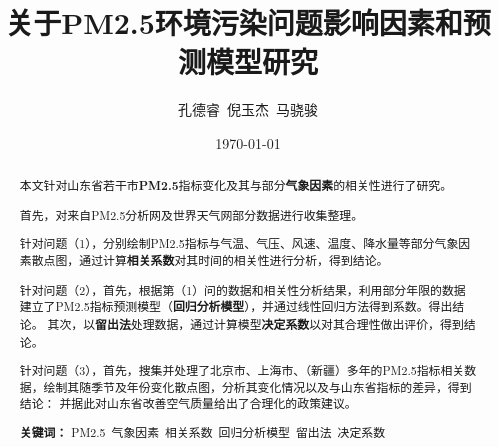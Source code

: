 \documentclass[12pt, a4paper, oneside]{ctexart}
\title{\textbf{\textbf{关于PM2.5环境污染问题影响因素和预测模型研究}}}
\author{孔德睿\ 倪玉杰\ 马骁骏}
\date{\today}
\begin{document}
    \thispagestyle{empty}
    \tableofcontents

    \newpage
    \setcounter{page}{0}
    \maketitle
    \thispagestyle{empty}

    \begin{abstract}
        本文针对山东省若干市\textbf{PM2.5}指标变化及其与部分\textbf{气象因素}的相关性进行了研究。
        \par 首先，对来自PM2.5分析网及世界天气网部分数据进行收集整理。
        \par 针对问题（1），分别绘制PM2.5指标与气温、气压、风速、温度、降水量等部分气象因素散点图，通过计算\textbf{相关系数}对其时间的相关性进行分析，得到结论。
        \par 针对问题（2），首先，根据第（1）问的数据和相关性分析结果，利用部分年限的数据建立了PM2.5指标预测模型（\textbf{回归分析模型}），并通过线性回归方法得到系数。得出结论。
        其次，以\textbf{留出法}处理数据，通过计算模型\textbf{决定系数}以对其合理性做出评价，得到结论。
        \par 针对问题（3），首先，搜集并处理了北京市、上海市、（新疆）多年的PM2.5指标相关数据，绘制其随季节及年份变化散点图，分析其变化情况以及与山东省指标的差异，得到结论：
        并据此对山东省改善空气质量给出了合理化的政策建议。

        \par\textbf{关键词：} {PM2.5}\ {气象因素}\ {相关系数}\ {回归分析模型}\ {留出法}\ {决定系数}
    \end{abstract}


    \newpage
    \setcounter{page}{1}

\end{document}
